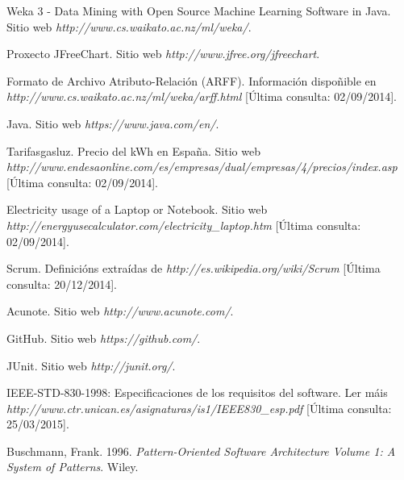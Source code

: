 

\begin{thebibliography}{99}

 Weka 3 - Data Mining with Open Source Machine Learning Software in Java. Sitio web {\it http://www.cs.waikato.ac.nz/ml/weka/}.

 Proxecto JFreeChart. Sitio web {\it http://www.jfree.org/jfreechart}.

 Formato de Archivo Atributo-Relación (ARFF). Información dispoñible en {\it http://www.cs.waikato.ac.nz/ml/weka/arff.html} [Última consulta: 02/09/2014].

 Java. Sitio web {\it https://www.java.com/en/}.

 Tarifasgasluz. Precio del kWh en España. Sitio web {\it http://www.endesaonline.com/es/empresas/dual/empresas/4/precios/index.asp} [Última consulta: 02/09/2014].

 Electricity usage of a Laptop or Notebook. Sitio web {\it http://energyusecalculator.com/electricity\_laptop.htm} [Última consulta: 02/09/2014].

 Scrum. Definicións extraídas de {\it http://es.wikipedia.org/wiki/Scrum} [Última consulta: 20/12/2014].

 Acunote. Sitio web {\it http://www.acunote.com/}.

 GitHub. Sitio web {\it https://github.com/}.

 JUnit. Sitio web {\it http://junit.org/}.

 IEEE-STD-830-1998: Especificaciones de los requisitos del software. Ler máis {\it http://www.ctr.unican.es/asignaturas/is1/IEEE830\_esp.pdf} [Última consulta: 25/03/2015].

 Buschmann, Frank. 1996. \textit{Pattern-Oriented Software Architecture Volume 1: A System of Patterns}. Wiley. 

\end{thebibliography}

